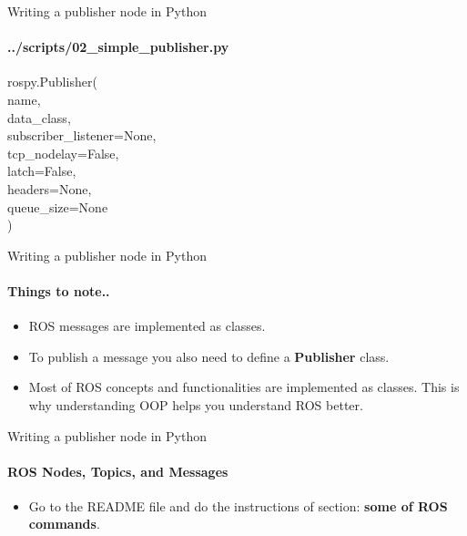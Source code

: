 \documentclass{beamer}
\begin{document}
\begin{frame}[fragile]{Writing a publisher node in Python}
    \framesubtitle{../scripts/02\_simple\_publisher.py}
    \begin{focus}
        
        \ttfamily rospy.Publisher(\\
                                 {\color{red}name},\\
                                 {\color{red}data\_class},\\
                                 {\color{blue}subscriber\_listener=None}, \\
                                 {\color{blue}tcp\_nodelay=False},\\
                                 {\color{blue}latch=False},\\
                                 {\color{blue}headers=None},\\
                                 {\color{red}queue\_size=None}\\)
    \end{focus}

\end{frame}


\begin{frame}[fragile]{Writing a publisher node in Python}
    \framesubtitle{Things to note..}
    
    \begin{itemize}
        \item  ROS messages are implemented as classes.
        \item  To publish a message you also need to define a \textbf{Publisher} class.
        \item Most of ROS concepts and functionalities are implemented as classes. This is why understanding OOP helps you understand ROS better.
    \end{itemize}   
\end{frame}


\begin{frame}[fragile]{Writing a publisher node in Python}
    \framesubtitle{ROS Nodes, Topics, and Messages}
    
    \begin{itemize}
        \centering
        \item  Go to the README file and do the instructions of section: \textbf{some of ROS commands}.
    \end{itemize}   
\end{frame}
\end{document}
